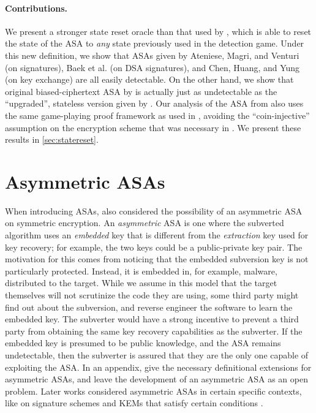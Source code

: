 \paragraph{Contributions.}
We present a stronger state reset oracle than that used by \cite{BSKC2019}, which is able to reset the state of the ASA to \emph{any} state previously used in the detection game. Under this new definition, we show that ASAs given by Ateniese, Magri, and Venturi \cite{CCS:AteMagVen15} (on signatures), Baek et al. \cite{BSKC2019} (on DSA signatures), and Chen, Huang, and Yung \cite{AC:CheHuaYun20} (on key exchange) are all easily detectable. On the other hand, we show that original biased-ciphertext ASA by \cite{C:BelPatRog14} is actually just as undetectable as the ``upgraded'', stateless version given by \cite{CCS:BelJaeKan15}. Our analysis of the ASA from \cite{C:BelPatRog14} also uses the same game-playing proof framework as used in \cite{CCS:BelJaeKan15}, avoiding the ``coin-injective'' assumption on the encryption scheme that was necessary in \cite{C:BelPatRog14}. We present these results in \autoref{sec:statereset}.

\section{Asymmetric ASAs}
When introducing ASAs, \cite{C:BelPatRog14} also considered the possibility of an asymmetric ASA on symmetric encryption. An \emph{asymmetric} ASA is one where the subverted algorithm uses an \emph{embedded} key that is different from the \emph{extraction} key used for key recovery; for example, the two keys could be a public-private key pair. The motivation for this comes from noticing that the embedded subversion key is not particularly protected. Instead, it is embedded in, for example, malware, distributed to the target. While we assume in this model that the target themselves will not scrutinize the code they are using, some third party might find out about the subversion, and reverse engineer the software to learn the embedded key. The subverter would have a strong incentive to prevent a third party from obtaining the same key recovery capabilities as the subverter. If the embedded key is presumed to be public knowledge, and the ASA remains undetectable, then the subverter is assured that they are the only one capable of exploiting the ASA. In an appendix, \cite{C:BelPatRog14} give the necessary definitional extensions for asymmetric ASAs, and leave the development of an asymmetric ASA as an open problem. Later works considered asymmetric ASAs in certain specific contexts, like on signature schemes and KEMs that satisfy certain conditions \cite{AC:CheHuaYun20,BSKC2019}.

